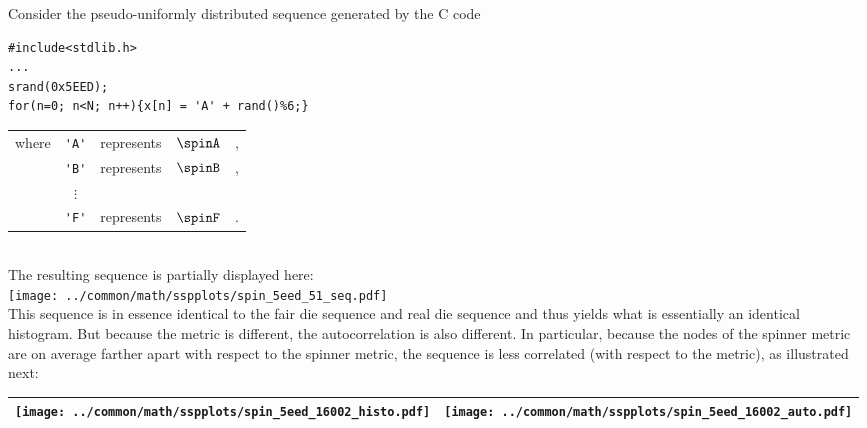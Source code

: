 \begin{example}
\label{ex:spinner_sha}
Consider the pseudo-uniformly distributed   
sequence generated by the C code\footnotemark 
%
\\\begin{minipage}{85mm}%
\begin{lstlisting}
#include<stdlib.h>
...
srand(0x5EED);
for(n=0; n<N; n++){x[n] = 'A' + rand()%6;}
\end{lstlisting}
\end{minipage}%
\hspace{10mm}%
\begin{tabular}{lclcl}
  where & \lstinline!'A'! &represents& $\spinA$ &,
     \\ & \lstinline!'B'! &represents& $\spinB$ &,
     \\ & $\vdots$
     \\ & \lstinline!'F'! &represents& $\spinF$ &.
\end{tabular}
\\
The resulting sequence is partially displayed here:
   \\\texttt{[image: ../common/math/sspplots/spin\_5eed\_51\_seq.pdf]}\\
This sequence is in essence identical to the fair die sequence  and real die sequence 
and thus yields what is essentially an identical histogram.
But because the metric is different, the autocorrelation  is also different.
In particular, because the nodes of the spinner metric are on average farther apart with respect to the spinner metric,
the sequence is less correlated (with respect to the metric), as illustrated next:
\\\begin{tabular}{|>{\scs}c|>{\scs}c|}
     \hline
     \texttt{[image: ../common/math/sspplots/spin\_5eed\_16002\_histo.pdf]}%
    &\texttt{[image: ../common/math/sspplots/spin\_5eed\_16002\_auto.pdf]}
   \\\hline
\end{tabular}
\end{example}


